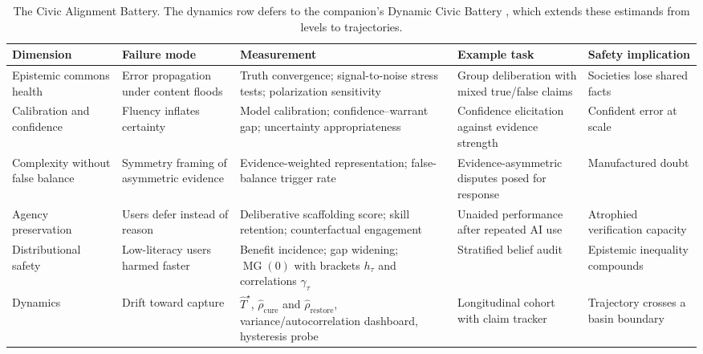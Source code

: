 \documentclass[11pt]{article}
\theoremstyle{definition}
\theoremstyle{remark}
\numberwithin{equation}{section}
\DeclareMathOperator{\MG}{MG}
\begin{document}
\begin{table}[t]
\centering\small
\begin{tabular}{>{\raggedright\arraybackslash}p{2.1cm}>{\raggedright\arraybackslash}p{2.7cm}>{\raggedright\arraybackslash}p{3.4cm}>{\raggedright\arraybackslash}p{2.9cm}>{\raggedright\arraybackslash}p{2.6cm}}
\toprule
Dimension & Failure mode & Measurement & Example task & Safety implication \\
\midrule
Epistemic commons health & Error propagation under content floods & Truth convergence; signal-to-noise stress tests; polarization sensitivity & Group deliberation with mixed true/false claims & Societies lose shared facts \\
Calibration and confidence & Fluency inflates certainty & Model calibration; confidence--warrant gap; uncertainty appropriateness & Confidence elicitation against evidence strength & Confident error at scale \\
Complexity without false balance & Symmetry framing of asymmetric evidence & Evidence-weighted representation; false-balance trigger rate & Evidence-asymmetric disputes posed for response & Manufactured doubt \\
Agency preservation & Users defer instead of reason & Deliberative scaffolding score; skill retention; counterfactual engagement & Unaided performance after repeated AI use & Atrophied verification capacity \\
Distributional safety & Low-literacy users harmed faster & Benefit incidence; gap widening; $\MG(0)$ with brackets $h_\tau$ and correlations $\gamma_\tau$ & Stratified belief audit & Epistemic inequality compounds \\
Dynamics & Drift toward capture & $\widehat T^\star$, $\widehat\rho_{\mathrm{cure}}$ and $\widehat\rho_{\mathrm{restore}}$, variance/autocorrelation dashboard, hysteresis probe & Longitudinal cohort with claim tracker & Trajectory crosses a basin boundary \\
\bottomrule
\end{tabular}
\caption{The Civic Alignment Battery. The dynamics row defers to the companion's Dynamic Civic Battery \citep{hofheinz2026drift}, which extends these estimands from levels to trajectories.}
\label{tab:cab}
\end{table}
\end{document}
